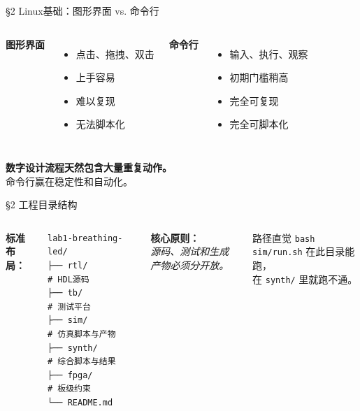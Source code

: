 \documentclass[aspectratio=169]{beamer}
\begin{document}
\begin{frame}{\S2 Linux基础：图形界面 vs. 命令行}
\begin{columns}
\textbf{图形界面}
\begin{itemize}
  \item 点击、拖拽、双击
  \item 上手容易
  \item 难以复现
  \item 无法脚本化
\end{itemize}
\textbf{命令行}
\begin{itemize}
  \item 输入、执行、观察
  \item 初期门槛稍高
  \item \alert{完全可复现}
  \item \alert{完全可脚本化}
\end{itemize}
\end{columns}
\vspace{0.8em}
\centering
\textbf{数字设计流程天然包含大量重复动作。}\\
命令行赢在稳定性和自动化。
\end{frame}

\begin{frame}[fragile]{\S2 工程目录结构}
\begin{columns}
\textbf{标准布局：}
\begin{verbatim}
lab1-breathing-led/
├── rtl/          # HDL源码
├── tb/           # 测试平台
├── sim/          # 仿真脚本与产物
├── synth/        # 综合脚本与结果
├── fpga/         # 板级约束
└── README.md
\end{verbatim}
\textbf{核心原则：}\\
\textit{源码、测试和生成产物必须分开放。}\\[1em]
\begin{alertblock}{路径直觉}
\texttt{bash sim/run.sh} 在此目录能跑，\\在 \texttt{synth/} 里就跑不通。
\end{alertblock}
\end{columns}
\end{frame}
\end{document}
